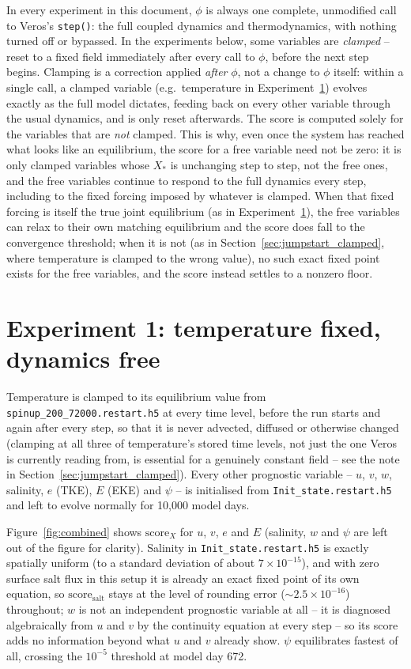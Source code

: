 \documentclass{article}
\begin{document}
In every experiment in this document, $\phi$ is always one complete, unmodified call to Veros's \texttt{step()}: the full coupled dynamics and thermodynamics, with nothing turned off or bypassed. In the experiments below, some variables are \emph{clamped} -- reset to a fixed field immediately after every call to $\phi$, before the next step begins. Clamping is a correction applied \emph{after} $\phi$, not a change to $\phi$ itself: within a single call, a clamped variable (e.g.\ temperature in Experiment~\ref{sec:exp1}) evolves exactly as the full model dictates, feeding back on every other variable through the usual dynamics, and is only reset afterwards. The score is computed solely for the variables that are \emph{not} clamped. This is why, even once the system has reached what looks like an equilibrium, the score for a free variable need not be zero: it is only clamped variables whose $X_\ast$ is unchanging step to step, not the free ones, and the free variables continue to respond to the full dynamics every step, including to the fixed forcing imposed by whatever is clamped. When that fixed forcing is itself the true joint equilibrium (as in Experiment~\ref{sec:exp1}), the free variables can relax to their own matching equilibrium and the score does fall to the convergence threshold; when it is not (as in Section~\ref{sec:jumpstart_clamped}, where temperature is clamped to the wrong value), no such exact fixed point exists for the free variables, and the score instead settles to a nonzero floor.

\section{Experiment 1: temperature fixed, dynamics free}\label{sec:exp1}

Temperature is clamped to its equilibrium value from \texttt{spinup\_200\_72000.restart.h5} at every time level, before the run starts and again after every step, so that it is never advected, diffused or otherwise changed (clamping at all three of temperature's stored time levels, not just the one Veros is currently reading from, is essential for a genuinely constant field -- see the note in Section~\ref{sec:jumpstart_clamped}). Every other prognostic variable -- $u$, $v$, $w$, salinity, $e$ (TKE), $E$ (EKE) and $\psi$ -- is initialised from \texttt{Init\_state.restart.h5} and left to evolve normally for 10{,}000 model days.

Figure~\ref{fig:combined} shows $\text{score}_X$ for $u$, $v$, $e$ and $E$ (salinity, $w$ and $\psi$ are left out of the figure for clarity). Salinity in \texttt{Init\_state.restart.h5} is exactly spatially uniform (to a standard deviation of about $7\times10^{-15}$), and with zero surface salt flux in this setup it is already an exact fixed point of its own equation, so $\text{score}_\text{salt}$ stays at the level of rounding error ($\sim 2.5\times10^{-16}$) throughout; $w$ is not an independent prognostic variable at all -- it is diagnosed algebraically from $u$ and $v$ by the continuity equation at every step -- so its score adds no information beyond what $u$ and $v$ already show. $\psi$ equilibrates fastest of all, crossing the $10^{-5}$ threshold at model day 672.
\end{document}
